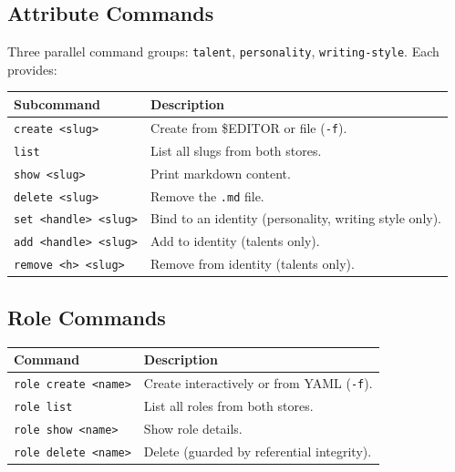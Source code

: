 \documentclass[a4paper,10pt]{article}
\newcommand{\cmd}[1]{\texttt{#1}}
\begin{document}
\subsection{Attribute Commands}

Three parallel command groups: \cmd{talent}, \cmd{personality},
\cmd{writing-style}.  Each provides:

\begin{center}
\begin{tabular}{@{}lp{6.5cm}@{}}
\toprule
\textbf{Subcommand} & \textbf{Description} \\
\midrule
\cmd{create <slug>}       & Create from \$EDITOR or file (\cmd{-f}). \\
\cmd{list}                & List all slugs from both stores. \\
\cmd{show <slug>}         & Print markdown content. \\
\cmd{delete <slug>}       & Remove the \texttt{.md} file. \\
\cmd{set <handle> <slug>} & Bind to an identity (personality, writing
                            style only). \\
\cmd{add <handle> <slug>} & Add to identity (talents only). \\
\cmd{remove <h> <slug>}   & Remove from identity (talents only). \\
\bottomrule
\end{tabular}
\end{center}

\subsection{Role Commands}

\begin{center}
\begin{tabular}{@{}lp{6.5cm}@{}}
\toprule
\textbf{Command} & \textbf{Description} \\
\midrule
\cmd{role create <name>}  & Create interactively or from YAML
                            (\cmd{-f}). \\
\cmd{role list}            & List all roles from both stores. \\
\cmd{role show <name>}     & Show role details. \\
\cmd{role delete <name>}   & Delete (guarded by referential
                            integrity). \\
\bottomrule
\end{tabular}
\end{center}
\end{document}
